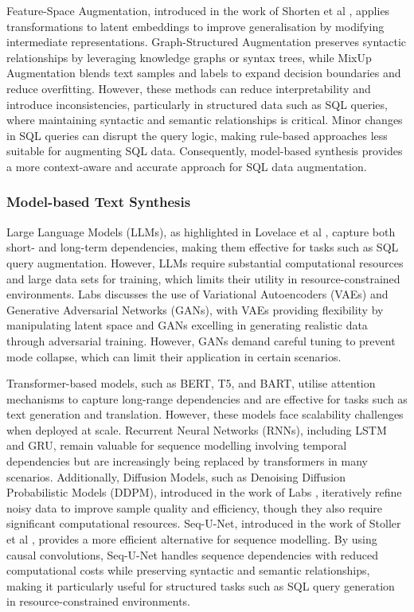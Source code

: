 \documentclass[journal]{IEEEtran}
\begin{document}
Feature-Space Augmentation, introduced in the work of Shorten et al \cite{shorten2021text}, applies transformations to latent embeddings to improve generalisation by modifying intermediate representations. Graph-Structured Augmentation preserves syntactic relationships by leveraging knowledge graphs or syntax trees, while MixUp Augmentation blends text samples and labels to expand decision boundaries and reduce overfitting. However, these methods can reduce interpretability and introduce inconsistencies, particularly in structured data such as SQL queries, where maintaining syntactic and semantic relationships is critical. Minor changes in SQL queries can disrupt the query logic, making rule-based approaches less suitable for augmenting SQL data. Consequently, model-based synthesis provides a more context-aware and accurate approach for SQL data augmentation.

\subsubsection{Model-based Text Synthesis}
Large Language Models (LLMs), as highlighted in Lovelace et al \cite{lovelace2024sample}, capture both short- and long-term dependencies, making them effective for tasks such as SQL query augmentation. However, LLMs require substantial computational resources and large data sets for training, which limits their utility in resource-constrained environments. Labs \cite{v7labs2022synthetic} discusses the use of Variational Autoencoders (VAEs) and Generative Adversarial Networks (GANs), with VAEs providing flexibility by manipulating latent space and GANs excelling in generating realistic data through adversarial training. However, GANs demand careful tuning to prevent mode collapse, which can limit their application in certain scenarios.

Transformer-based models, such as BERT, T5, and BART, utilise attention mechanisms to capture long-range dependencies and are effective for tasks such as text generation and translation. However, these models face scalability challenges when deployed at scale. Recurrent Neural Networks (RNNs), including LSTM and GRU, remain valuable for sequence modelling involving temporal dependencies but are increasingly being replaced by transformers in many scenarios. Additionally, Diffusion Models, such as Denoising Diffusion Probabilistic Models (DDPM), introduced in the work of Labs \cite{v7labs2022synthetic}, iteratively refine noisy data to improve sample quality and efficiency, though they also require significant computational resources. Seq-U-Net, introduced in the work of Stoller et al \cite{stoller2019seq}, provides a more efficient alternative for sequence modelling. By using causal convolutions, Seq-U-Net handles sequence dependencies with reduced computational costs while preserving syntactic and semantic relationships, making it particularly useful for structured tasks such as SQL query generation in resource-constrained environments.
\end{document}

